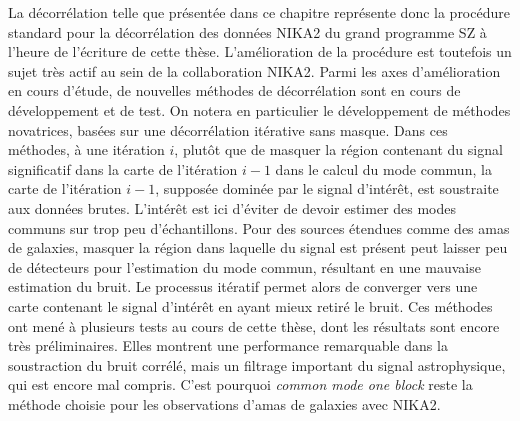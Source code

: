 La décorrélation telle que présentée dans ce chapitre représente donc la procédure standard pour la décorrélation des données NIKA2 du grand programme SZ à l'heure de l'écriture de cette thèse.
L'amélioration de la procédure est toutefois un sujet très actif au sein de la collaboration NIKA2.
Parmi les axes d'amélioration en cours d'étude, de nouvelles méthodes de décorrélation sont en cours de développement et de test.
On notera en particulier le développement de méthodes novatrices, basées sur une décorrélation itérative sans masque.
Dans ces méthodes, à une itération $i$, plutôt que de masquer la région contenant du signal significatif dans la carte de l'itération $i-1$ dans le calcul du mode commun, la carte de l'itération $i-1$, supposée dominée par le signal d'intérêt, est soustraite aux données brutes.
L'intérêt est ici d'éviter de devoir estimer des modes communs sur trop peu d'échantillons.
Pour des sources étendues comme des amas de galaxies, masquer la région dans laquelle du signal est présent peut laisser peu de détecteurs pour l'estimation du mode commun, résultant en une mauvaise estimation du bruit.
Le processus itératif permet alors de converger vers une carte contenant le signal d'intérêt en ayant mieux retiré le bruit.
Ces méthodes ont mené à plusieurs tests au cours de cette thèse, dont les résultats sont encore très préliminaires.
Elles montrent une performance remarquable dans la soustraction du bruit corrélé, mais un filtrage important du signal astrophysique, qui est encore mal compris.
C'est pourquoi \textit{common mode one block} reste la méthode choisie pour les observations d'amas de galaxies avec NIKA2.

